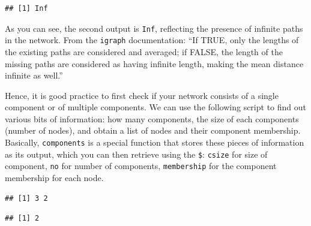 \documentclass[
]{book}
\newenvironment{Shaded}{\begin{snugshade}}{\end{snugshade}}
\newcommand{\AttributeTok}[1]{\textcolor[rgb]{0.13,0.29,0.53}{#1}}
\newcommand{\CommentTok}[1]{\textcolor[rgb]{0.56,0.35,0.01}{\textit{#1}}}
\newcommand{\FunctionTok}[1]{\textcolor[rgb]{0.13,0.29,0.53}{\textbf{#1}}}
\newcommand{\NormalTok}[1]{#1}
\newcommand{\OtherTok}[1]{\textcolor[rgb]{0.56,0.35,0.01}{#1}}
\newcommand{\SpecialCharTok}[1]{\textcolor[rgb]{0.81,0.36,0.00}{\textbf{#1}}}
\begin{document}
\begin{verbatim}
## [1] Inf
\end{verbatim}

As you can see, the second output is \texttt{Inf}, reflecting the presence of infinite paths in the network. From the \texttt{igraph} documentation: ``If TRUE, only the lengths of the existing paths are considered and averaged; if FALSE, the length of the missing paths are considered as having infinite length, making the mean distance infinite as well.''

Hence, it is good practice to first check if your network consists of a single component or of multiple components. We can use the following script to find out various bits of information: how many components, the size of each components (number of nodes), and obtain a list of nodes and their component membership. Basically, \texttt{components} is a special function that stores these pieces of information as its output, which you can then retrieve using the \texttt{\$}: \texttt{csize} for size of component, \texttt{no} for number of components, \texttt{membership} for the component membership for each node.

\begin{Shaded}
\end{Shaded}

\begin{verbatim}
## [1] 3 2
\end{verbatim}

\begin{Shaded}
\end{Shaded}

\begin{verbatim}
## [1] 2
\end{verbatim}

\begin{Shaded}
\end{Shaded}
\end{document}
